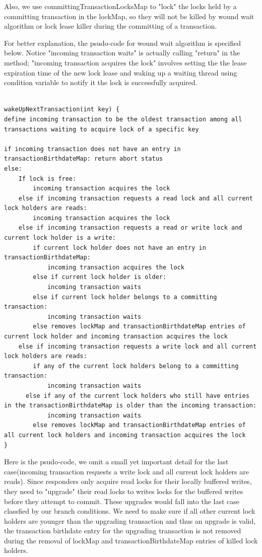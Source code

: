 \documentclass[10pt,twocolumn]{article}
\begin{document}
Also, we use committingTransactionLocksMap to "lock" the locks held by a committing transaction in the lockMap, so they will not be killed by wound wait algorithm or lock lease killer during the committing of a transaction.

For better explanation, the psudo-code for wound wait algorithm is specified below. Notice "incoming transaction waits" is actually calling "return" in the method; "incoming transaction acquires the lock" involves setting the the lease expiration time of the new lock lease and waking up a waiting thread using condition variable to notify it the lock is successfully acquired. 
\begin{lstlisting}

wakeUpNextTransaction(int key) {
define incoming transaction to be the oldest transaction among all transactions waiting to acquire lock of a specific key

if incoming transaction does not have an entry in transactionBirthdateMap: return abort status
else:
	If lock is free:
		incoming transaction acquires the lock
	else if incoming transaction requests a read lock and all current lock holders are reads:
		incoming transaction acquires the lock	
	else if incoming transaction requests a read or write lock and current lock holder is a write:
		if current lock holder does not have an entry in transactionBirthdateMap: 
			incoming transaction acquires the lock
		else if current lock holder is older: 
			incoming transaction waits 
		else if current lock holder belongs to a committing transaction:
			incoming transaction waits 
		else removes lockMap and transactionBirthdateMap entries of current lock holder and incoming transaction acquires the lock
    else if incoming transaction requests a write lock and all current lock holders are reads:
		if any of the current lock holders belong to a committing transaction:
			incoming transaction waits
      else if any of the current lock holders who still have entries in the transactionBirthdateMap is older than the incoming transaction:
			incoming transaction waits
		else removes lockMap and transactionBirthdateMap entries of all current lock holders and incoming transaction acquires the lock
}
\end{lstlisting}
Here is the psudo-code, we omit a small yet important detail for the last case(incoming transaction requests a write lock and all current lock holders are reads). Since responders only acquire read locks for their locally buffered writes, they need to "upgrade" their read locks to writes locks for the buffered writes before they attempt to commit. These upgrades would fall into the last case classfied by our branch conditions. We need to make sure if all other current lock holders are younger than the upgrading transaction and thus an upgrade is valid, the transaction birthdate entry for the upgrading transaction is not removed during the removal of lockMap and transactionBirthdateMap entries of killed lock holders.
\end{document}
